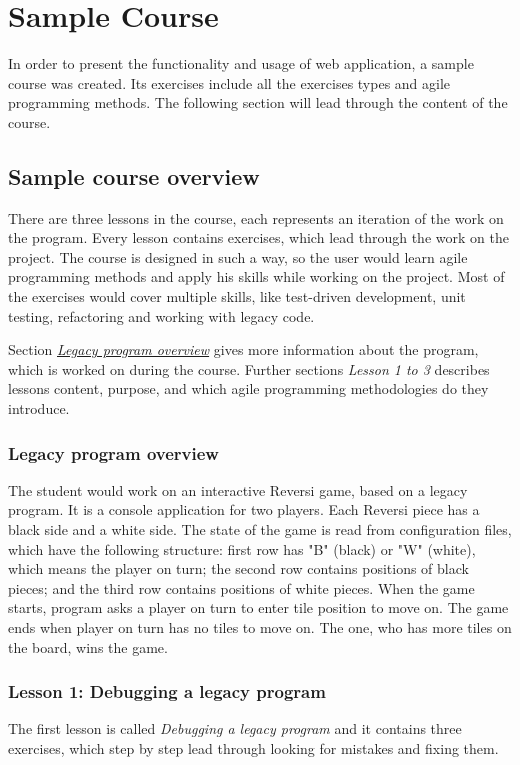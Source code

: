 \chapter[Sample Course]{Sample Course}
\label{ch:sample_course}

In order to present the functionality and usage of web application, a sample course was created. Its exercises include all the exercises types and agile programming methods. The following section will lead through the content of the course.

    \section{Sample course overview}
    There are three lessons in the course, each represents an iteration of the work on the program. Every lesson contains exercises, which lead through the work on the project. The course is designed in such a way, so the user would learn agile programming methods and apply his skills while working on the project. Most of the exercises would cover multiple skills, like test-driven development, unit testing, refactoring and working with legacy code.
    
    Section \href{subsec:legacy-program}{\textit{Legacy program overview}} gives more information about the program, which is worked on during the course. Further sections \textit{Lesson 1 to 3} describes lessons content, purpose, and which agile programming methodologies do they introduce.
    
    
    \subsection{Legacy program overview}
    \label{subsec:legacy-program}
    The student would work on an interactive Reversi game, based on a legacy program. It is a console application for two players. Each Reversi piece has a black side and a white side. The state of the game is read from configuration files, which have the following structure: first row has "B" (black) or "W" (white), which means the player on turn; the second row contains positions of black pieces; and the third row contains positions of white pieces. When the game starts, program asks a player on turn to enter tile position to move on. The game ends when player on turn has no tiles to move on. The one, who has more tiles on the board, wins the game.
    
    
    \subsection{Lesson 1: Debugging a legacy program}
    The first lesson is called \textit{Debugging a legacy program} and it contains three exercises, which step by step lead through looking for mistakes and fixing them.
        
